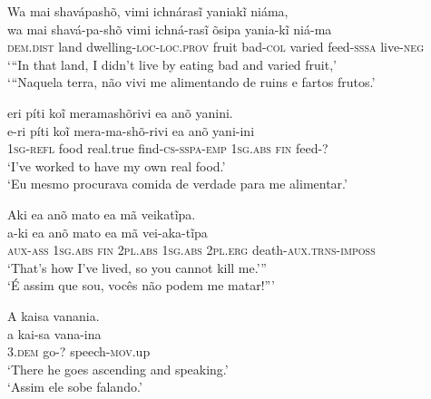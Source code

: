 \documentclass[output=paper,
modfonts,nonflat
]{langsci/langscibook}
\begin{document}

\newpage 
\ea  Wa mai shavápashõ, vimi ichnárasĩ yaniakĩ niáma, \\[.3em]
\gll wa                mai  shavá-pa-shõ                   vimi  ichná-rasĩ       õsipa  yania-kĩ           niá-ma            \\
     \textsc{dem.dist} land dwelling-\textsc{loc-loc.prov} fruit bad-\textsc{col} varied feed-\textsc{sssa} live-\textsc{neg} \\
\glt ‘“In that land, I didn't live by eating bad and varied fruit,' \\
`“Naquela terra, não vivi me alimentando de ruins e fartos frutos.'\\
\z

\ea eri píti koĩ meramashõrivi ea anõ yanini. \\[.3em]
\gll e-ri              píti koĩ       mera-ma-shõ-rivi          ea               anõ          yani-ini        \\
     1\textsc{sg-refl} food real.true find-\textsc{cs-sspa-emp} \textsc{1sg.abs} \textsc{fin} feed-\textsc{?} \\
\glt `I've worked to have my own real food.' \\
`Eu mesmo procurava comida de verdade para me alimentar.' \\
\z

\ea Aki ea anõ mato ea mã veikatĩpa. \\[.3em]
\gll a-ki             ea               anõ          mato            ea               mã              vei-aka-tĩpa                   \\
     \textsc{aux-ass} \textsc{1sg.abs} \textsc{fin} \textsc{2pl.abs} \textsc{1sg.abs} \textsc{2pl.erg} death-\textsc{aux.trns-imposs} \\
\glt `That's how I've lived, so you cannot kill me.''' \\
`É assim que sou, vocês não podem me matar!”'\\
\z

\ea A kaisa vanania. \\[.3em]
\gll a              kai-sa vana-ina               \\
     3.\textsc{dem} go-?   speech-\textsc{mov}.up \\
\glt `There he goes ascending and speaking.' \\
`Assim ele sobe falando.' \\
\z
\end{document}

